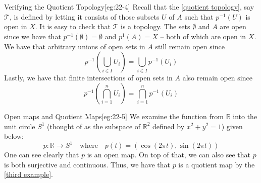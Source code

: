 \begin{egBox}{Verifying the Quotient Topology}[eg:22-4]
    Recall that the [\hyperlink{def:22_quotient_top}{quotient topology}], 
    say \( \mathcal{T} \), is defined by letting it consists of those subsets 
    \( U \) of \( A \) such that \( p^{ -1 } ( U ) \) is open in \( X \).
    It is easy to check that \( \mathcal{T} \) is a topology.
    The sets \( \emptyset \) and \( A \) are open since we have that 
    \( p^{ -1 } ( \emptyset ) = \emptyset \) and \( p^{ 1 } ( A ) = X \) -- both
    of which are open in \( X \).
    We have that arbitrary unions of open sets in \( A \) still remain open
    since
    \begin{equation*}
        p^{ -1 } \left( \bigcup_{ i \in I } U_{ i } \right) 
        =
        \bigcup_{ i \in I } p^{ -1 } ( U_{ i } )
    \end{equation*}
    Lastly, we have that finite intersections of open sets in \( A \) also
    remain open since
    \begin{equation*}
        p^{ -1 } \left( \bigcap_{ i = 1 }^{ n } U_{ i } \right)
        =
        \bigcap_{ i = 1 }^{ n } p^{ -1 } ( U_{ i } )
    \end{equation*}
\end{egBox}

\begin{egBox}{Open maps and Quotient Maps}[eg:22-5]
    We examine the function from \( \mathbb{R} \) into the unit circle
    \( S^{ 1 } \) (thought of as the subspace of \( \mathbb{R}^{ 2 } \) defined
    by \( x^{ 2 } + y^{ 2 } = 1 \)) given below:
    \begin{equation*}
        p: \mathbb{R} \rightarrow S^{ 1 }
        \quad \mathrm{where} \quad 
        p ( t )
        =
        ( \cos ( 2 \pi t ), \sin ( 2 \pi t ) )
    \end{equation*}
    One can see clearly that \( p \) is an open map.
    On top of that, we can also see that \( p \) is both surjective and 
    continuous.
    Thus, we have that \( p \) is a quotient map by the 
    [\hyperlink{eg:22-3}{third example}].
\end{egBox}

